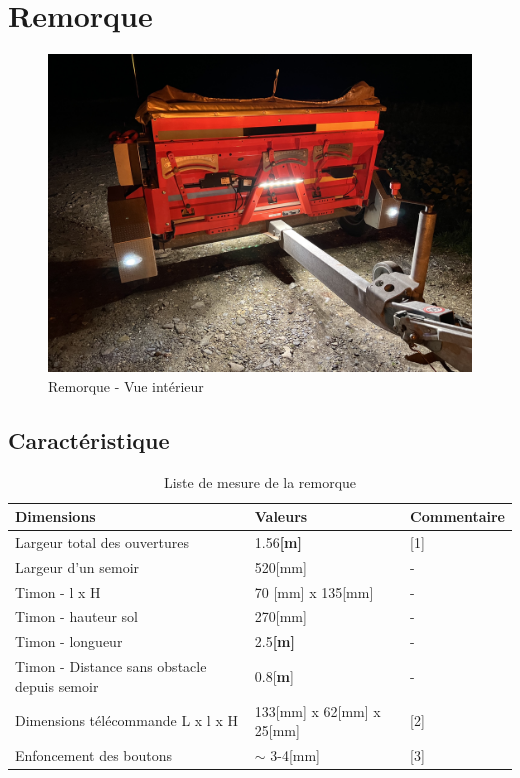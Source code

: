 \section{Remorque}
\begin{figure}[H]
    \centering
    \includegraphics[width=12cm]{assets/figures/remorque.jpeg}
    \caption{Remorque - Vue intérieur}
\end{figure}
\subsection{Caractéristique}
\begin{table}[H]
    \begin{center}
        \caption{Liste de mesure de la remorque}
        \begin{tabular}{|l|l|l|}
            Dimensions                                   & Valeurs                   & Commentaire \\ \hline
            Largeur total des ouvertures                 & 1.56\textbf{[m]}          & [1]         \\
            Largeur d'un semoir                          & 520[mm]                   & -           \\
            Timon - l x H                                & 70 [mm] x 135[mm]         & -           \\
            Timon - hauteur sol                          & 270[mm]                   & -           \\
            Timon - longueur                             & 2.5\textbf{[m]}           & -           \\
            Timon - Distance sans obstacle depuis semoir & 0.8[\textbf{m}]           & -           \\
            Dimensions télécommande L x l x H            & 133[mm] x 62[mm] x 25[mm] & [2]         \\
            Enfoncement des boutons                      & $\sim$ 3-4[mm]            & [3]         \\
        \end{tabular}
    \end{center}
\end{table}

